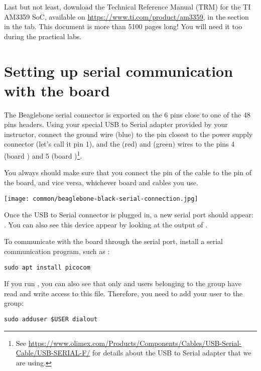 Last but not least, download the Technical Reference Manual (TRM) for
the TI AM3359 SoC, available on \url{https://www.ti.com/product/am3359},
in the  section in the  tab.
This document is more than 5100 pages long! You will need it
too during the practical labs.

\section{Setting up serial communication with the board}

The Beaglebone serial connector is exported on the 6 pins close to one
of the 48 pins headers. Using your special USB to Serial adapter provided
by your instructor, connect the ground wire (blue) to the pin closest
to the power supply connector (let's call it pin 1), and the  (red)
and  (green) wires to the pins 4 (board ) and
5 (board )\footnote{See
\url{https://www.olimex.com/Products/Components/Cables/USB-Serial-Cable/USB-SERIAL-F/}
for details about the USB to Serial adapter that we are using.}.

You always should make sure that you connect the  pin of the cable
to the  pin of the board, and vice versa, whichever board and
cables you use.

\begin{center}
\texttt{[image: common/beaglebone-black-serial-connection.jpg]}
\end{center}

Once the USB to Serial connector is plugged in, a new serial port
should appear: .  You can also see this device
appear by looking at the output of .

To communicate with the board through the serial port, install a
serial communication program, such as :

\begin{verbatim}
sudo apt install picocom
\end{verbatim}

If you run , you can also see that only
 and users belonging to the  group have
read and write access to this file. Therefore, you need to add your user
to the  group:

\begin{verbatim}
sudo adduser $USER dialout
\end{verbatim}

